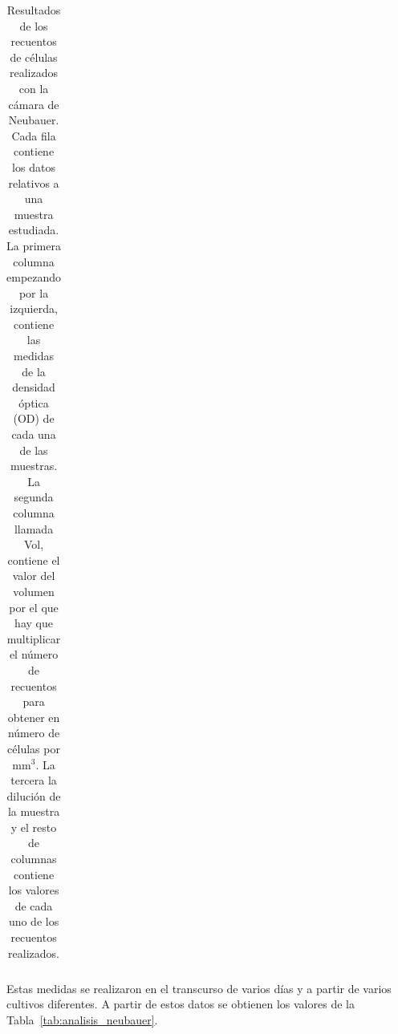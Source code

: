 \begin{spacing}{1}
\begin{table}[H]
\begin{tabular}{ R{1.2cm} C{0.8cm} C{1.1cm} C{0.4cm} C{0.4cm} C{0.4cm} C{0.4cm} C{0.4cm} C{0.4cm} C{0.4cm} C{0.4cm} C{0.4cm} C{0.4cm} C{0.4cm} C{0.4cm} C{0.4cm} C{0.4cm} C{0.4cm} }
        \hline
    \end{tabular}

    \caption{\small Resultados de los recuentos de células realizados con la cámara de Neubauer. Cada fila contiene los datos relativos a una muestra estudiada. La primera columna empezando por la izquierda, contiene las medidas de la densidad óptica (OD) de cada una de las muestras. La segunda columna llamada  Vol, contiene el valor del volumen por el que hay que multiplicar el número de recuentos  para obtener en número de células por $\mathrm{mm^{3}}$. La tercera la dilución de la muestra y el resto de columnas contiene los valores de cada uno de los recuentos realizados.}
    \label{tab:resultados_neubauer}
    
\end{table}

\end{spacing}

Estas medidas se realizaron en el transcurso de varios días y a partir de varios cultivos diferentes.
A partir de estos datos se obtienen los valores de la Tabla~\ref{tab:analisis_neubauer}.

    



